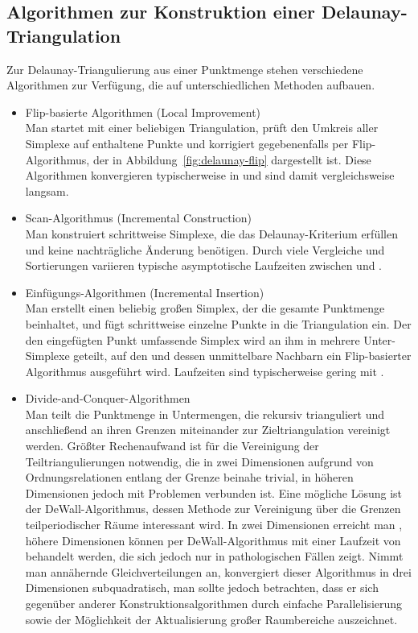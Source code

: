 \subsection{Algorithmen zur Konstruktion einer Delaunay-Triangulation}


Zur Delaunay-Triangulierung aus einer Punktmenge stehen verschiedene Algorithmen zur Verfügung, die auf unterschiedlichen Methoden aufbauen.

\begin{itemize}
\item Flip-basierte Algorithmen (Local Improvement)\\
  Man startet mit einer beliebigen Triangulation, prüft den Umkreis aller Simplexe auf enthaltene Punkte und korrigiert gegebenenfalls per Flip-Algorithmus, der in Abbildung~\ref{fig:delaunay-flip} dargestellt ist.
  Diese Algorithmen konvergieren typischerweise in  und sind damit vergleichsweise langsam.

\item Scan-Algorithmus (Incremental Construction)\\
  Man konstruiert schrittweise Simplexe, die das Delaunay-Kriterium erfüllen und keine nachträgliche Änderung benötigen.
  Durch viele Vergleiche und Sortierungen variieren typische asymptotische Laufzeiten zwischen  und .

\item Einfügungs-Algorithmen (Incremental Insertion)\\
  Man erstellt einen beliebig großen Simplex, der die gesamte Punktmenge beinhaltet, und fügt schrittweise einzelne Punkte in die Triangulation ein.
  Der den eingefügten Punkt umfassende Simplex wird an ihm in mehrere Unter-Simplexe geteilt, auf den und dessen unmittelbare Nachbarn ein Flip-basierter Algorithmus ausgeführt wird.
  Laufzeiten sind typischerweise gering mit .

\item Divide-and-Conquer-Algorithmen\\
  Man teilt die Punktmenge in Untermengen, die rekursiv trianguliert und anschließend an ihren Grenzen miteinander zur Zieltriangulation vereinigt werden.
  Größter Rechenaufwand ist für die Vereinigung der Teiltriangulierungen notwendig, die in zwei Dimensionen aufgrund von Ordnungsrelationen entlang der Grenze beinahe trivial, in höheren Dimensionen jedoch mit Problemen verbunden ist.
  Eine mögliche Lösung ist der DeWall-Algorithmus\cite{cignoni_dewall:_1998}, dessen Methode zur Vereinigung über die Grenzen teilperiodischer Räume interessant wird.
  In zwei Dimensionen erreicht man , höhere Dimensionen können per DeWall-Algorithmus mit einer Laufzeit von  behandelt werden, die sich jedoch nur in pathologischen Fällen zeigt.
  Nimmt man annähernde Gleichverteilungen an, konvergiert dieser Algorithmus in drei Dimensionen subquadratisch, man sollte jedoch betrachten, dass er sich gegenüber anderer Konstruktionsalgorithmen durch einfache Parallelisierung sowie der Möglichkeit der Aktualisierung großer Raumbereiche auszeichnet.


\end{itemize}

